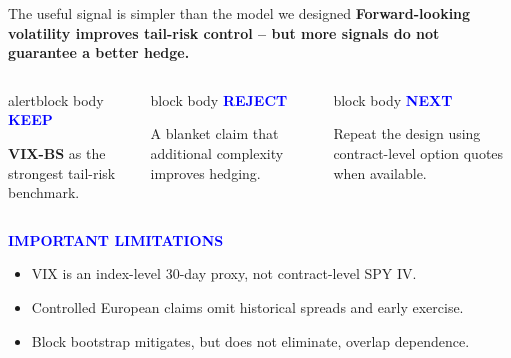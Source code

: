 \documentclass[aspectratio=169,10pt]{beamer}
\newcommand{\tagline}[1]{\textcolor{Blue}{\bfseries\scriptsize\MakeUppercase{#1}}}
\begin{document}
\begin{frame}{The useful signal is simpler than the model we designed}
\vspace{0.2cm}
{\fontsize{19}{23}\selectfont\bfseries Forward-looking volatility improves tail-risk control -- but more signals do not guarantee a better hedge.}
\vspace{0.6cm}
\begin{columns}[T,onlytextwidth]
\begin{beamercolorbox}[rounded=true,sep=0.3cm]{alertblock body}
\tagline{Keep}\par\vspace{0.12cm}
\textbf{VIX-BS} as the strongest tail-risk benchmark.
\end{beamercolorbox}
\begin{beamercolorbox}[rounded=true,sep=0.3cm]{block body}
\tagline{Reject}\par\vspace{0.12cm}
A blanket claim that additional complexity improves hedging.
\end{beamercolorbox}
\begin{beamercolorbox}[rounded=true,sep=0.3cm]{block body}
\tagline{Next}\par\vspace{0.12cm}
Repeat the design using contract-level option quotes when available.
\end{beamercolorbox}
\end{columns}
\vspace{0.55cm}
\tagline{Important limitations}
\begin{itemize}
  \item VIX is an index-level 30-day proxy, not contract-level SPY IV.
  \item Controlled European claims omit historical spreads and early exercise.
  \item Block bootstrap mitigates, but does not eliminate, overlap dependence.
\end{itemize}
\end{frame}
\end{document}
